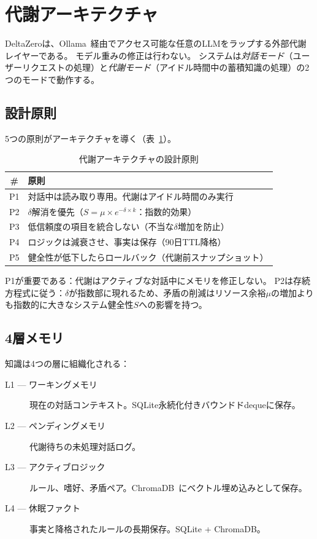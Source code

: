 \documentclass[11pt,a4paper]{article}
\begin{document}
\section{代謝アーキテクチャ}
\label{sec:architecture}

DeltaZeroは、Ollama~\citep{ollama}経由でアクセス可能な任意のLLMをラップする外部代謝レイヤーである。
モデル重みの修正は行わない。
システムは\emph{対話モード}（ユーザーリクエストの処理）と\emph{代謝モード}（アイドル時間中の蓄積知識の処理）の2つのモードで動作する。

\subsection{設計原則}

5つの原則がアーキテクチャを導く（表~\ref{tab:principles}）。

\begin{table}[htbp]
\centering
\caption{代謝アーキテクチャの設計原則}
\label{tab:principles}
\begin{tabular}{cl}
\toprule
\# & 原則 \\
\midrule
P1 & 対話中は読み取り専用。代謝はアイドル時間のみ実行 \\
P2 & $\delta$解消を優先（$S = \mu \times e^{-\delta \times k}$：指数的効果） \\
P3 & 低信頼度の項目を統合しない（不当な$\delta$増加を防止） \\
P4 & ロジックは減衰させ、事実は保存（90日TTL降格） \\
P5 & 健全性が低下したらロールバック（代謝前スナップショット） \\
\bottomrule
\end{tabular}
\end{table}

P1が重要である：代謝はアクティブな対話中にメモリを修正しない。
P2は存続方程式に従う：$\delta$が指数部に現れるため、矛盾の削減はリソース余裕$\mu$の増加よりも指数的に大きなシステム健全性$S$への影響を持つ。

\subsection{4層メモリ}

知識は4つの層に組織化される：

\begin{description}
\item[L1 --- ワーキングメモリ] 現在の対話コンテキスト。SQLite永続化付きバウンドドdequeに保存。
\item[L2 --- ペンディングメモリ] 代謝待ちの未処理対話ログ。
\item[L3 --- アクティブロジック] ルール、嗜好、矛盾ペア。ChromaDB~\citep{chromadb}にベクトル埋め込みとして保存。
\item[L4 --- 休眠ファクト] 事実と降格されたルールの長期保存。SQLite + ChromaDB。
\end{description}
\end{document}
